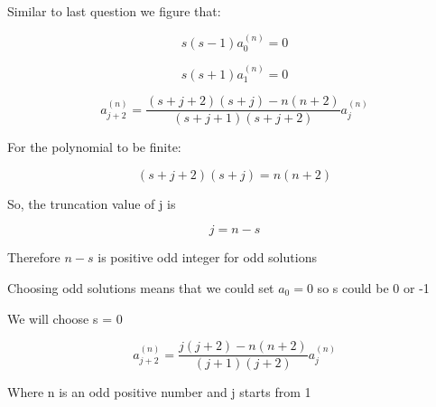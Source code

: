 \documentclass[12pt]{article}
\begin{document}
Similar to last question we figure that:

\[
    s(s-1) a_0^{(n)} = 0
\]

\[
    s(s+1) a_1^{(n)} = 0
\]

\[
    a_{j+2}^{(n)} = \frac{(s+j+2)(s+j) - n(n+2)}{(s+j+1)(s+j+2)}a_j^{(n)}
\]







For the polynomial to be finite:

\[
    (s+j+2)(s+j) = n(n+2)
\]

So, the truncation value of j is

\[
    j = n -s
\]

Therefore $n-s$ is positive odd integer for odd solutions

Choosing odd solutions means that we could set $a_0 = 0$ so s could be 0 or -1

We will choose s = 0

\[
    a_{j+2}^{(n)} = \frac{j(j+2) - n(n+2)}{(j+1)(j+2)}a_j^{(n)}
\]

Where n is an odd positive number and j starts from 1

\newpage



\nocite{arfken2013mathematical}
\nocite{El-Deeb_PEU-455_Assignments}
\end{document}
